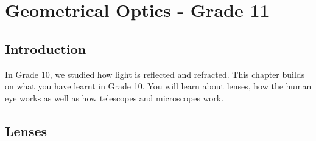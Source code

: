 \chapter{Geometrical Optics - Grade 11}
\label{p:wsl:go11}

\section{Introduction}
In Grade 10, we studied how light is reflected and refracted. This chapter builds on what you have learnt in Grade 10. You will learn about lenses, how the human eye works as well as how telescopes and microscopes work.

\section{Lenses}

